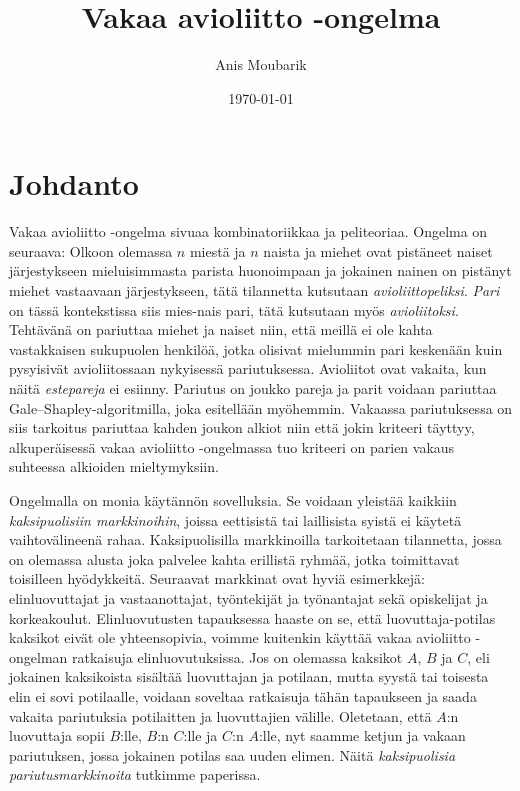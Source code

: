 \documentclass[finnish]{tktltiki2}
\title{Vakaa avioliitto -ongelma}
\author{Anis Moubarik}
\date{\today}
\theoremstyle{definition}
\theoremstyle{remark}
\begin{document}

\maketitle        %
\newpage          %



\section{Johdanto}
Vakaa avioliitto -ongelma sivuaa kombinatoriikkaa ja peliteoriaa. Ongelma on seuraava: Olkoon olemassa $n$ miestä ja $n$ naista ja miehet ovat pistäneet naiset järjestykseen mieluisimmasta parista huonoimpaan ja jokainen nainen on pistänyt miehet vastaavaan järjestykseen, tätä tilannetta kutsutaan \emph{avioliittopeliksi}. \emph{Pari} on tässä kontekstissa siis mies-nais pari, tätä kutsutaan myös \emph{avioliitoksi}. Tehtävänä on pariuttaa miehet ja naiset niin, että meillä ei ole kahta vastakkaisen sukupuolen henkilöä, jotka olisivat mielummin pari keskenään kuin pysyisivät avioliitossaan nykyisessä pariutuksessa. Avioliitot ovat vakaita, kun näitä \emph{estepareja} ei esiinny. Pariutus on joukko pareja ja parit voidaan pariuttaa Gale--Shapley-algoritmilla, joka esitellään myöhemmin. Vakaassa pariutuksessa on siis tarkoitus pariuttaa kahden joukon alkiot niin että jokin kriteeri täyttyy, alkuperäisessä vakaa avioliitto -ongelmassa tuo kriteeri on parien vakaus suhteessa alkioiden mieltymyksiin.

Ongelmalla on monia käytännön sovelluksia. Se voidaan yleistää kaikkiin \emph{kaksipuolisiin markkinoihin}, joissa eettisistä tai laillisista syistä ei käytetä vaihtovälineenä rahaa. Kaksipuolisilla markkinoilla tarkoitetaan tilannetta, jossa on olemassa alusta joka palvelee kahta erillistä ryhmää, jotka toimittavat toisilleen hyödykkeitä. Seuraavat markkinat ovat hyviä esimerkkejä: elinluovuttajat ja vastaanottajat, työntekijät ja työnantajat sekä opiskelijat ja korkeakoulut. Elinluovutusten tapauksessa haaste on se, että luovuttaja-potilas kaksikot eivät ole yhteensopivia, voimme kuitenkin käyttää vakaa avioliitto -ongelman ratkaisuja elinluovutuksissa. Jos on olemassa kaksikot $A$, $B$ ja $C$, eli jokainen kaksikoista sisältää luovuttajan ja potilaan, mutta syystä tai toisesta elin ei sovi potilaalle, voidaan soveltaa ratkaisuja tähän tapaukseen ja saada vakaita pariutuksia potilaitten ja luovuttajien välille. Oletetaan, että $A$:n luovuttaja sopii $B$:lle, $B$:n $C$:lle ja $C$:n $A$:lle, nyt saamme ketjun ja vakaan pariutuksen, jossa jokainen potilas saa uuden elimen. Näitä \emph{kaksipuolisia pariutusmarkkinoita} tutkimme paperissa.
\end{document}
